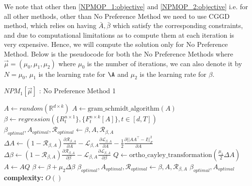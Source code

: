We note that other then \ref{NPMOP_1:objective} and \ref{NPMOP_2:objective} i.e. for all other methods, other than No Preference Method we need to use CGGD method, which relies on having $\bar{A}, \bar{\beta}$ which satisfy the corresponding constraints, and due to computational limitations as to compute them at each iteration is very expensive. Hence, we will compute the solution only for No Preference Method. Below is the pseudocode for both the No Preference Methods where $\vec{\mu} = (\mu_0,\mu_1,\mu_2)$ where $\mu_0$ is the number of iterations, we can also denote it by $N=\mu_0$, $\mu_1$ is the learning rate for $\A$ and $\mu_2$ is the learning rate for $\beta$.

\begin{algorithm}[H]
\caption{$NPM_1[\vec{\mu}]$ : No Preference Method 1}\label{no_preference_method_1}
\begin{algorithmic}[1]
\State $A \gets random(\mathbb{R}^{d\times k})$
\State $A \gets \text{gram\_schmidt\_algorithm}(A)$
\State $\beta \gets regression(\{R^{n\times 1}_{t}\},\{F^{n\times k}_{t}[A]\}, t\in [d,T])$
\State $\beta_{optimal}, A_{optimal}, \mathcal{R}_{optimal} \gets \beta, A, \mathcal{R}_{\beta, A}$
    \State $\Delta A \gets (1-\mathcal{R}_{\beta, A})\frac{\partial \mathcal{R}_{\beta, A}}{\partial A} - \mathcal{L}_{\beta, A} \frac{\partial \mathcal{L}_{\beta, A}}{\partial A}- \frac{1}{2}\frac{\partial ||AA^\top -I||^2_F}{\partial A} $
    \State $\Delta \beta \gets (1-\mathcal{R}_{\beta, A})\frac{\partial \mathcal{R}_{\beta, A}}{\partial \beta} - \mathcal{L}_{\beta, A} \frac{\partial \mathcal{L}_{\beta, A}}{\partial \beta} $
    \State $Q \gets \text{ortho\_cayley\_transformation}(\frac{\mu_1}{2} \Delta A)$
    \State $A \gets AQ$
    \State $\beta \gets \beta + \mu_2 \Delta \beta$
      
        \State $\beta_{optimal}, A_{optimal}, \mathcal{R}_{optimal} \gets \beta, A, \mathcal{R}_{\beta, A} $
    \EndIf 
\EndFor
\State \Return  $\beta_{optimal}, A_{optimal}$
\State \textbf{complexity: } $O()$
\end{algorithmic}
\end{algorithm}

